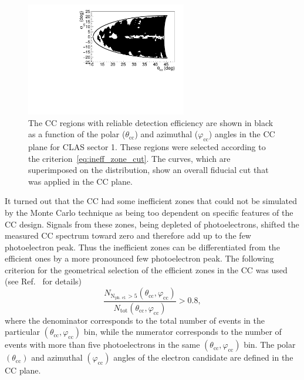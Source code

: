 \documentclass[prc,twocolumn,superscriptaddress,showpacs,amssymb,amsmath,amsfonts,aps,nofootinbib]{revtex4-1}
\begin{document}
\begin{figure}[htp]
\begin{center}

\includegraphics[width=7cm,keepaspectratio]{pictures/electron_id/ph_vs_ph_cc.pdf}
\vspace{-0.1cm}
\caption{The CC regions with reliable detection efficiency are shown in black as a function of the polar ($\theta_{\text{cc}}$) and azimuthal ($\varphi_{\text{cc}}$) angles in the CC plane for CLAS sector 1. These regions were selected according to the criterion~\eqref{eq:ineff_zone_cut}. The curves, which are superimposed on the distribution,  show an overall fiducial cut that was applied in the CC plane.}
\label{fig:ph_vs_ph_cc}
\end{center}
\end{figure} 


It turned out that the CC had some inefficient zones  that could not be simulated by the Monte Carlo technique as being too dependent on specific features of the CC design.
Signals from these zones, being depleted of photoelectrons, shifted the measured CC spectrum toward zero and therefore add up to the few photoelectron peak. Thus the inefficient zones can be differentiated from the efficient ones by a more pronounced few photoelectron peak. The following criterion for the geometrical selection of the efficient zones in the CC was used (see Ref.~\cite{Fed_an_note:2017} for details)  
\begin{equation}
\frac{N_{\text{N}_{\text{ph. el.}}>5}(\theta_{\text{cc}},\varphi_{\text{cc}})}{N_{\text{tot}}(\theta_{\text{cc}},\varphi_{\text{cc}})} > 0.8,
\label{eq:ineff_zone_cut}
\end{equation}
where the denominator corresponds to the total number of events in the particular $(\theta_{\text{cc}},\varphi_{\text{cc}})$ bin, while the numerator corresponds to the number of events with more than five photoelectrons in the same $(\theta_{\text{cc}},\varphi_{\text{cc}})$ bin. The polar $(\theta_{\text{cc}})$ and azimuthal $(\varphi_{\text{cc}})$ angles of the electron candidate are defined in the CC plane.
\end{document}
